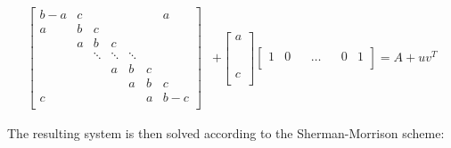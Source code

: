 \documentclass[twocolumn,10pt]{asme2ej}
\begin{document}
\begin{equation}
\begin{split}
\begin{bmatrix}
   { b-a } & { c } & {   }  & {   } & {   } & {   }& { a } \\
   { a } & { b } & { c }  & {   } & {   }  & {   } & {   }\\
   {   } &  { a } & { b } & { c }  & {   }  & {   } & {   }\\
   {   } & {   } & \ddots & \ddots  & \ddots & {   } &  {   } \\
   {   } & {   } & {   } & { a } & {b  } & {c  } & {   }\\
   {   } & {   } & {   } & {   } & {a  } & {b  } & { c }\\
   { c } & {   } & {   } & {   } & {   }  &  { a }  & { b-c }\\
\end{bmatrix}
& +
\begin{bmatrix}
   { a }\\
   {  } \\
   {   }\\
   {   }\\
   {   }\\
   {   }\\
   { c }\\
\end{bmatrix}
\begin{bmatrix}
   { 1 } & {0  } & {   }  & \hdots & {   } & {  0 }& { 1 } \\
\end{bmatrix}
=A + uv^T
\end{split}
\end{equation}

\noindent The resulting system is then solved according to the Sherman-Morrison scheme:
\end{document}
